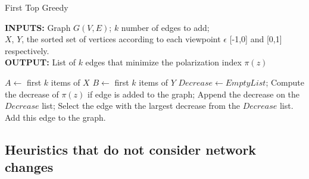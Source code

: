 \begin{algorithm}[htbp]
	\caption{First Top Greedy}
	\label{alg:kgreedy}
	
	\begin{flushleft}
        		\textbf{INPUTS:} Graph $G(V, E)$; $k$ number of edges to add;\\
		$X$, $Y $, the sorted set of vertices according to each viewpoint $\epsilon$ [-1,0] and [0,1] respectively.\\
		\vspace{6pt}
        		\textbf{OUTPUT:} List of $k$ edges that minimize the polarization index $\pi(z)$
	\end{flushleft}
	
	\begin{algorithmic}[1]
		\STATE $A \leftarrow $ first $k$ items of $X$
		\STATE $B \leftarrow $ first $k$ items of $Y$
			\STATE$Decrease \leftarrow Empty List$;
				\STATE Compute the decrease of $\pi(z)$ if edge is added to the graph;
				\STATE Append the decrease on the $Decrease$ list;
			\ENDFOR
			\STATE Select the edge with the largest decrease from the $Decrease$ list.
			\STATE Add this edge to the graph.
		\ENDFOR
	\end{algorithmic}
	
\end{algorithm}
		
\clearpage


\subsection{Heuristics that do not consider network changes}
\label{sec:netChangesConsidered}
\vspace{10pt}


